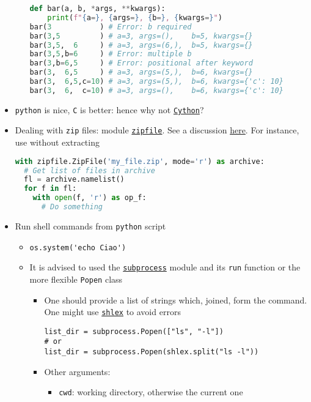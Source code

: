 \documentclass[a4paper,12pt,%
              final%
              ]{article}
\begin{document}
\begin{itemize}
\begin{itemize}
\begin{lstlisting}[language=python]
def bar(a, b, *args, **kwargs):
    print(f"{a=}, {args=}, {b=}, {kwargs=}")
bar(3           ) # Error: b required
bar(3,5         ) # a=3, args=(),    b=5, kwargs={}
bar(3,5,  6     ) # a=3, args=(6,),  b=5, kwargs={}
bar(3,5,b=6     ) # Error: multiple b
bar(3,b=6,5     ) # Error: positional after keyword
bar(3,  6,5     ) # a=3, args=(5,),  b=6, kwargs={}
bar(3,  6,5,c=10) # a=3, args=(5,),  b=6, kwargs={'c': 10}
bar(3,  6,  c=10) # a=3, args=(),    b=6, kwargs={'c': 10}
\end{lstlisting}
    \end{itemize}
  \item \texttt{python} is nice, \texttt{C} is better: hence why not \href{https://cython.readthedocs.io/en/latest/index.html}{\texttt{Cython}}?
  \item Dealing with \texttt{zip} files: module \href{https://docs.python.org/3/library/zipfile.html}{\texttt{zipfile}}. See a discussion \href{https://realpython.com/python-zipfile/}{here}. For instance, use without extracting
\begin{lstlisting}[language=python]
with zipfile.ZipFile('my_file.zip', mode='r') as archive:
  # Get list of files in archive
  fl = archive.namelist()
  for f in fl:
    with open(f, 'r') as op_f:
      # Do something
\end{lstlisting}
  \item Run shell commands from \texttt{python} script
    \begin{itemize}
      \item \verb|os.system('echo Ciao')|
      \item It is advised to used the \href{https://docs.python.org/3/library/subprocess.html}{\texttt{subprocess}} module and its \texttt{run} function or the more flexible \texttt{Popen} class
        \begin{itemize}
          \item One should provide a list of strings which, joined, form the command.
            One might use \href{https://docs.python.org/3/library/shlex.html}{\texttt{shlex}} to avoid errors
\begin{verbatim}
list_dir = subprocess.Popen(["ls", "-l"])
# or
list_dir = subprocess.Popen(shlex.split("ls -l"))
\end{verbatim}
          \item Other arguments:
            \begin{itemize}
              \item \texttt{cwd}: working directory, otherwise the current one

\end{itemize}
\end{itemize}
\end{itemize}
\end{itemize}
\end{document}

